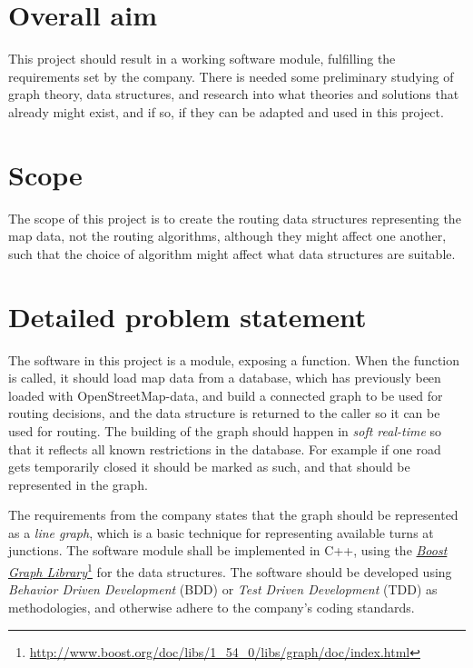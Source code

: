 \documentclass[../main.tex]{subfiles}
\begin{document}
\section{Overall aim}
This project should result in a working software module, fulfilling the requirements set by the company. There is needed some preliminary studying of graph theory, data structures, and research into what theories and solutions that already might exist, and if so, if they can be adapted and used in this project.

\section{Scope}
The scope of this project is to create the routing data structures representing the map data, not the routing algorithms, although they might affect one another, such that the choice of algorithm might affect what data structures are suitable.

\section{Detailed problem statement}
The software in this project is a module, exposing a function. When the function is called, it should load map data from a database, which has previously been loaded with OpenStreetMap-data, and build a connected graph to be used for routing decisions, and the data structure is returned to the caller so it can be used for routing. The building of the graph should happen in \emph{soft real-time} so that it reflects all known restrictions in the database. For example if one road gets temporarily closed it should be marked as such, and that should be represented in the graph.

The requirements from the company states that the graph should be represented as a \emph{line graph}, which is a basic technique for representing available turns at junctions. The software module shall be implemented in C++, using the \href{http://www.boost.org/doc/libs/1_54_0/libs/graph/doc/index.html}{\emph{Boost Graph Library}}\footnote{\url{http://www.boost.org/doc/libs/1_54_0/libs/graph/doc/index.html}} for the data structures. The software should be developed using \emph{Behavior Driven Development} (BDD) or \emph{Test Driven Development} (TDD) as methodologies, and otherwise adhere to the company's coding standards.
\end{document}
